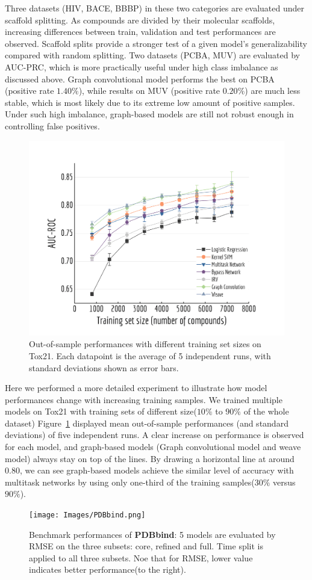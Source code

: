 Three datasets (HIV, BACE, BBBP) in these two categories are evaluated under scaffold splitting. As compounds are divided by their molecular scaffolds, increasing differences between train, validation and test performances are observed. Scaffold splits provide a stronger test of a given model's generalizability compared with random splitting. Two datasets (PCBA, MUV) are evaluated by AUC-PRC, which is more practically useful under high class imbalance as discussed above. Graph convolutional model performs the best on PCBA (positive rate $1.40\%$), while results on MUV (positive rate $0.20\%$) are much less stable, which is most likely due to its extreme low amount of positive samples. Under such high imbalance, graph-based models are still not robust enough in controlling false positives.

\begin{figure}[!h]
  \centering
  \includegraphics[width=.45\textwidth]{Images/Tox21_variable.png}
  \caption{Out-of-sample performances with different training set sizes on Tox21. Each datapoint is the average of 5 independent runs, with standard deviations shown as error bars.}
  \label{fig:Tox21_variable}
\end{figure}

Here we performed a more detailed experiment to illustrate how model performances change with increasing training samples. We trained multiple models on Tox21 with training sets of different size($10\%$ to $90\%$ of the whole dataset) Figure~\ref{fig:Tox21_variable} displayed mean out-of-sample performances (and standard deviations) of five independent runs. A clear increase on performance is observed for each model, and graph-based models (Graph convolutional model and weave model) always stay on top of the lines. By drawing a horizontal line at around 0.80, we can see graph-based models achieve the similar level of accuracy with multitask networks by using only one-third of the training samples($30\%$ versus $90\%$).

\begin{figure}[!h]
  \centering
  \texttt{[image: Images/PDBbind.png]}
  \caption{Benchmark performances of \textbf{PDBbind}: 5 models are evaluated by RMSE on the three subsets: core, refined and full. Time split is applied to all three subsets. Noe that for RMSE, lower value indicates better performance(to the right).}
  \label{fig:PDBbind}
\end{figure}

